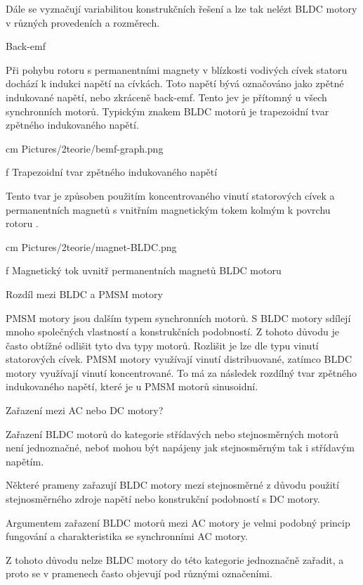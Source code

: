 Dále se vyznačují variabilitou konstrukčních řešení a lze tak nelézt BLDC motory v různých provedeních a rozměrech.

\secc Back-emf

Při pohybu rotoru s permanentními magnety v blízkosti vodivých cívek statoru dochází k indukci napětí na cívkách.
Toto napětí bývá označováno jako zpětné indukované napětí, nebo zkráceně back-emf.
Tento jev je přítomný u všech synchronních motorů. Typickým znakem BLDC motorů je trapezoidní tvar zpětného indukovaného 
napětí. %

\medskip
  cm \cinspic Pictures/2teorie/bemf-graph.png 
 \caption/f Trapezoidní tvar zpětného indukovaného napětí
 \medskip

Tento tvar je způsoben použitím koncentrovaného vinutí statorových cívek a permanentních magnetů s vnitřním magnetickým tokem 
kolmým k povrchu rotoru .

\medskip
  cm \cinspic Pictures/2teorie/magnet-BLDC.png 
 \caption/f Magnetický tok uvnitř permanentních magnetů BLDC motoru
 \medskip



\sec Rozdíl mezi BLDC a PMSM motory

PMSM  motory jsou dalším typem synchronních motorů. 
S BLDC motory sdílejí mnoho společných vlastností a konstrukčních podobností. Z tohoto důvodu
je často obtížné odlišit tyto dva typy motorů. Rozlišit je lze dle typu vinutí statorových cívek.
PMSM motory využívají vinutí distribuované, zatímco BLDC motory využívají vinutí koncentrované.
To má za následek rozdílný tvar zpětného indukovaného napětí, které je u PMSM motorů sinusoidní.

\sec Zařazení mezi AC nebo DC motory?

Zařazení BLDC motorů do kategorie střídavých nebo stejnosměrných motorů není jednoznačné, neboť 
mohou být napájeny jak stejnosměrným tak i střídavým napětím. %

Některé prameny zařazují BLDC motory mezi stejnosměrné z důvodu použití stejnosměrného zdroje napětí nebo konstrukční podobností 
s DC motory. 

Argumentem zařazení BLDC motorů mezi AC motory je velmi podobný princip fungování a charakteristika se synchronními AC motory.

Z tohoto důvodu nelze BLDC motory do této kategorie jednoznačně zařadit, a proto se v pramenech často objevují pod různými označeními.

